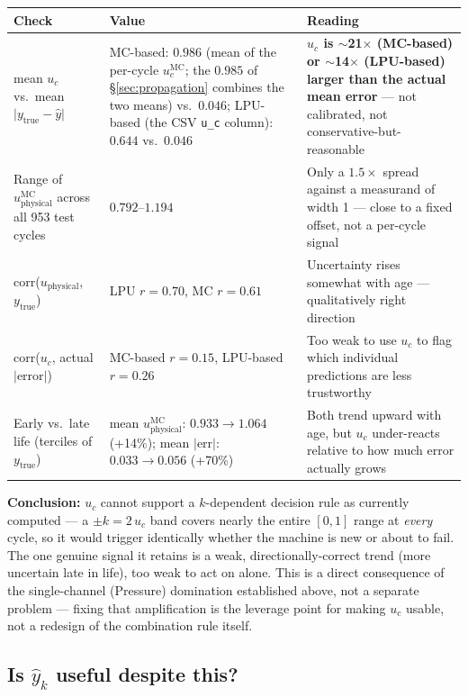 \documentclass[11pt]{article}
\begin{document}
\begin{center}
\begin{tabular}{@{}p{4.6cm}p{3.4cm}p{6.6cm}@{}}
\toprule
Check & Value & Reading \\
\midrule
mean $u_c$ vs.\ mean $\lvert y_\text{true}-\hat y\rvert$ &
MC-based: $0.986$ (mean of the per-cycle $u_c^{\mathrm{MC}}$; the $0.985$ of \S\ref{sec:propagation} combines the two means) vs.\ $0.046$; LPU-based (the CSV \texttt{u\_c} column): $0.644$ vs.\ $0.046$ &
\textbf{$u_c$ is $\sim$21$\times$ (MC-based) or $\sim$14$\times$ (LPU-based) larger than the actual mean error} ---
not calibrated, not conservative-but-reasonable \\
Range of $u_{\mathrm{physical}}^{\mathrm{MC}}$ across all 953 test cycles &
$0.792$--$1.194$ &
Only a $1.5\times$ spread against a measurand of width 1 --- close to a
fixed offset, not a per-cycle signal \\
corr($u_{\mathrm{physical}}$, $y_\text{true}$) &
LPU $r{=}0.70$, MC $r{=}0.61$ &
Uncertainty rises somewhat with age --- qualitatively right direction \\
corr($u_c$, actual $\lvert\text{error}\rvert$) &
MC-based $r{=}0.15$, LPU-based $r{=}0.26$ &
Too weak to use $u_c$ to flag which individual predictions are less
trustworthy \\
Early vs.\ late life (terciles of $y_\text{true}$) &
mean $u_{\mathrm{physical}}^{\mathrm{MC}}$: $0.933\!\to\!1.064$ (+14\%); mean $\lvert\text{err}\rvert$:
$0.033\!\to\!0.056$ (+70\%) &
Both trend upward with age, but $u_c$ under-reacts relative to how much
error actually grows \\
\bottomrule
\end{tabular}
\end{center}

\textbf{Conclusion:} $u_c$ cannot support a $k$-dependent decision rule as
currently computed --- a $\pm k{=}2\,u_c$ band covers nearly the entire
$[0,1]$ range at \emph{every} cycle, so it would trigger identically
whether the machine is new or about to fail. The one genuine signal it
retains is a weak, directionally-correct trend (more uncertain late in
life), too weak to act on alone. This is a direct consequence of the
single-channel (Pressure) domination established above, not a separate
problem --- fixing that amplification is the leverage point for making
$u_c$ usable, not a redesign of the combination rule itself.

\subsection{Is $\hat y_k$ useful despite this?}
\label{sec:yhat-useful}
\end{document}
